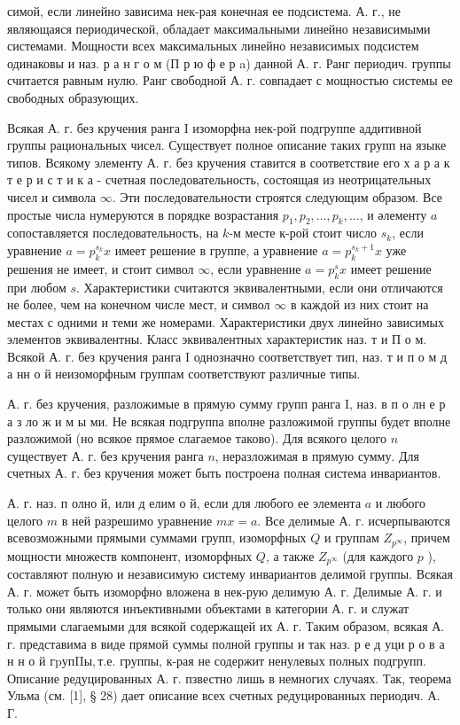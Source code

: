 \documentclass[10pt]{article}
\begin{document}
симой, если линейно зависима нек-рая конечная ее подсистема. А. г., не являющаяся периодической, обладает максимальными линейно независимыми системами. Мощности всех максимальных линейно независимых подсистем одинаковы и наз. р а н г о м (П р ю ф е р a) данной А. г. Ранг периодич. группы считается равным нулю. Ранг свободной А. г. совпадает с мощностью системы ее свободных образующих.



Всякая А. г. без кручения ранга I изоморфна нек-рой подгруппе аддитивной группы рациональных чисел. Существует полное описание таких групп на языке типов. Всякому элементу А. г. без кручения ставится в соответствие его х а р а к т е р и с т и к а - счетная последовательность, состоящая из неотрицательных чисел и символа $\infty$. Эти последовательности строятся следующим образом. Все простые числа нумеруются в порядке возрастания $p_{1}, p_{2}, \ldots, p_{k}, \ldots$, и әлементу $a$ сопоставляется последовательность, на $k$-м месте к-рой стоит число $s_{k}$, если уравнение $a=p_{k}^{s_{k}} x$ имеет решение в группе, а уравнение $a=p_{k}^{s_{k}+1} x$ уже решения не имеет, и стоит символ $\infty$, если уравнение $a=p_{k}^{s} x$ имеет решение при любом $s$. Характеристики считаются эквивалентными, если они отличаются не более, чем на конечном числе мест, и символ $\infty$ в каждой из них стоит на местах с одними и теми же номерами. Характеристики двух линейно зависимых элементов эквивалентны. Класс эквивалентных характеристик наз. т и П о м. Всякой А. г. без кручения ранга I однозначно соответствует тип, наз. т и п о м д а нн о й неизоморфным группам соответствуют различные типы.



А. г. без кручения, разложимые в прямую сумму групп ранга I, наз. в п о лн е р а з ло ж и м ы ми. Не всякая подгруппа вполне разложимой группы будет вполне разложимой (но всякое прямое слагаемое таково). Для всякого целого $n$ существует А. г. без кручения ранга $n$, неразложимая в прямую сумму. Для счетных А. г. без кручения может быть построена полная система инвариантов.



А. г. наз. п олно й, или д елим о й, если для любого ее элемента $a$ и любого целого $m$ в ней разрешимо уравнение $m x=a$. Все делимые А. г. исчерпываются всевозможными прямыми суммами групп, изоморфных $Q$ и группам $Z_{p^{\infty}}$, причем мощности множеств компонент, изоморфных $Q$, а также $Z_{p^{\infty}}$ (для каждого $p$ ), составляют полную и независимую систему инвариантов делимой группы. Всякая А. г. может быть изоморфно вложена в нек-рую делимую А. г. Делимые А. г. и только они являются инъективными объектами в категории А. г. и служат прямыми слагаемыми для всякой содержащей их А. г. Таким образом, всякая А. г. представима в виде прямой суммы полной группы и так наз. р е д уци р о в а н н о й $г \mathrm{p} \mathrm{уп \Pi ы,} \mathrm{т.} \mathrm{е.}$ группы, к-рая не содержит ненулевых полных подгрупп. Описание редуцированных А. г. пзвестно лишь в немногих случаях. Так, теорема Ульма (см. [1], § 28) дает описание всех счетных редуцированных периодич. А. Г.
\end{document}
